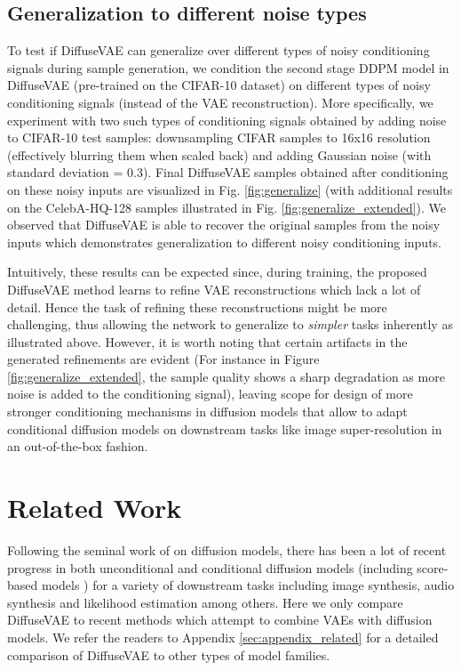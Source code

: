 \documentclass[10pt]{article} \usepackage[accepted]{tmlr}
\begin{document}
\subsection{Generalization to different noise types}
\label{sec:generalize}
To test if DiffuseVAE can generalize over different types of noisy conditioning signals during sample generation, we condition the second stage DDPM model in DiffuseVAE (pre-trained on the CIFAR-10 dataset) on different types of noisy conditioning signals (instead of the VAE reconstruction). More specifically, we experiment with two such types of conditioning signals obtained by adding noise to CIFAR-10 test samples: downsampling CIFAR samples to 16x16 resolution (effectively blurring them when scaled back) and adding Gaussian noise (with standard deviation = 0.3). Final DiffuseVAE samples obtained after conditioning on these noisy inputs are visualized in Fig. \ref{fig:generalize} (with additional results on the CelebA-HQ-128 samples illustrated in Fig. \ref{fig:generalize_extended}). We observed that DiffuseVAE is able to recover the original samples from the noisy inputs which demonstrates generalization to different noisy conditioning inputs.

Intuitively, these results can be expected since, during training, the proposed DiffuseVAE method learns to refine VAE reconstructions which lack a lot of detail. Hence the task of refining these reconstructions might be more challenging, thus allowing the network to generalize to \textit{simpler} tasks inherently as illustrated above. However, it is worth noting that certain artifacts in the generated refinements are evident (For instance in Figure \ref{fig:generalize_extended}, the sample quality shows a sharp degradation as more noise is added to the conditioning signal), leaving scope for design of more stronger conditioning mechanisms in diffusion models that allow to adapt conditional diffusion models on downstream tasks like image super-resolution in an out-of-the-box fashion.



\section{Related Work}

Following the seminal work of \citep{sohldickstein2015deep, ho2020denoising} on diffusion models, there has been a lot of recent progress in both unconditional \citep{nichol2021improved, dhariwal2021diffusion, kingma2021variational} and conditional diffusion models \citep{ho2021cascaded, saharia2021image, choi2021ilvr, chen2020wavegrad} (including score-based models \citep{song2021scorebased, song2020generative}) for a variety of downstream tasks including image synthesis, audio synthesis and likelihood estimation among others. Here we only compare DiffuseVAE to recent methods which attempt to combine VAEs with diffusion models. We refer the readers to Appendix \ref{sec:appendix_related} for a detailed comparison of DiffuseVAE to other types of model families.
\end{document}
